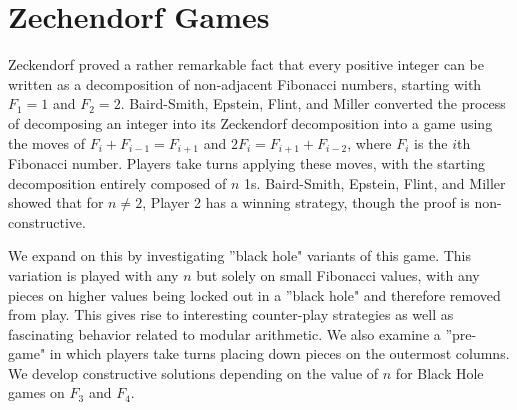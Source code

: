 \documentclass{article}
\begin{document}
\section{Zechendorf Games}
Zeckendorf proved a rather remarkable fact that every positive integer can be written as a decomposition of non-adjacent Fibonacci numbers, starting with $F_1 = 1$ and $F_2 = 2$. Baird-Smith, Epstein, Flint, and Miller converted the process of decomposing an integer into its Zeckendorf decomposition into a game using the moves of $F_i + F_{i-1} = F_{i+1}$ and $2F_i = F_{i+1} + F_{i-2}$, where $F_i$ is the $i$th Fibonacci number. Players take turns applying these moves, with the starting decomposition entirely composed of $n$ 1s. Baird-Smith, Epstein, Flint, and Miller showed that for $n \neq 2$, Player 2 has a winning strategy, though the proof is non-constructive.

We expand on this by investigating ''black hole" variants of this game. This variation is played with any $n$ but solely on small Fibonacci values, with any pieces on higher values being locked out in a ''black hole" and therefore removed from play. This gives rise to interesting counter-play strategies as well as fascinating behavior related to modular arithmetic. We also examine a ''pre-game" in which players take turns placing down pieces on the outermost columns. We develop constructive solutions depending on the value of $n$ for Black Hole games on $F_3$ and $F_4$.
\end{document}
